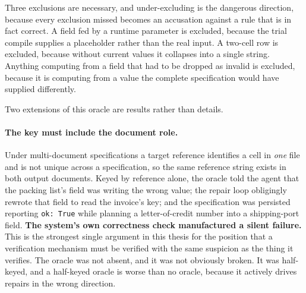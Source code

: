 Three exclusions are necessary, and under-excluding is the dangerous direction, because every
exclusion missed becomes an accusation against a rule that is in fact correct. A field fed by a
runtime parameter is excluded, because the trial compile supplies a placeholder rather than the real
input. A two-cell row is excluded, because without current values it collapses into a single string.
Anything computing from a field that had to be dropped as invalid is excluded, because it is
computing from a value the complete specification would have supplied differently.

Two extensions of this oracle are results rather than details.

\paragraph{The key must include the document role.}
Under multi-document specifications a target reference identifies a cell in \emph{one} file and is
not unique across a specification, so the same reference string exists in both output documents.
Keyed by reference alone, the oracle told the agent that the packing list's field was writing the
wrong value; the repair loop obligingly rewrote that field to read the invoice's key; and the
specification was persisted reporting \texttt{ok: True} while planning a letter-of-credit number
into a shipping-port field. \textbf{The system's own correctness check manufactured a silent
failure.} This is the strongest single argument in this thesis for the position that a verification
mechanism must be verified with the same suspicion as the thing it verifies. The oracle was not
absent, and it was not obviously broken. It was half-keyed, and a half-keyed oracle is worse than no
oracle, because it actively drives repairs in the wrong direction.

